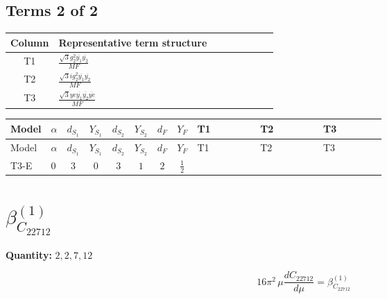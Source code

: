 \documentclass[8pt]{article}
\begin{document}
\begin{landscape}
\subsection*{Terms 2 of 2}
\begin{center}
\begin{tabular}{@{}c >{\raggedright\arraybackslash}p{0.82\linewidth}@{}}
\toprule
Column & Representative term structure \\
\midrule
T1 & \(\displaystyle \frac{\sqrt{3} g_{2}^{2} \overline{y_{1}} \overline{y_{2}}}{MF}\) \\
\midrule
T2 & \(\displaystyle \frac{\sqrt{3} i g_{2}^{2} \overline{y_{1}} \overline{y_{2}}}{MF}\) \\
\midrule
T3 & \(\displaystyle \frac{\sqrt{3} ye \overline{y_{1}} \overline{y_{2}} \overline{ye}}{MF}\) \\
\midrule
\bottomrule
\end{tabular}
\end{center}
\smallskip
\tiny
\begin{longtable}{@{}llcccccc >{\raggedright\arraybackslash}p{0.21\linewidth} >{\raggedright\arraybackslash}p{0.21\linewidth} >{\raggedright\arraybackslash}p{0.21\linewidth}@{}}
\toprule
Model & $\alpha$ & $d_{S_1}$ & $Y_{S_1}$ & $d_{S_2}$ & $Y_{S_2}$ & $d_F$ & $Y_F$ & T1 & T2 & T3 \\
\midrule
\endfirsthead
\toprule
Model & $\alpha$ & $d_{S_1}$ & $Y_{S_1}$ & $d_{S_2}$ & $Y_{S_2}$ & $d_F$ & $Y_F$ & T1 & T2 & T3 \\
\midrule
\endhead
T3-E & $0$ & $3$ & $0$ & $3$ & $1$ & $2$ & $\frac{1}{2}$ & \scriptsize\adjustbox{max width=\linewidth}{$\begin{gathered} \frac{11 \sqrt{3} g_{2}^{2} \overline{y_{1}} \overline{y_{2}}}{8 MF}\end{gathered}$} & \scriptsize\adjustbox{max width=\linewidth}{$\begin{gathered} - \frac{\sqrt{3} i g_{2}^{2} \overline{y_{1}} \overline{y_{2}}}{6 MF}\end{gathered}$} & \scriptsize\adjustbox{max width=\linewidth}{$\begin{gathered} - \frac{\sqrt{3} ye \overline{y_{1}} \overline{y_{2}} \overline{ye}}{12 MF}\end{gathered}$} \\
\midrule
\bottomrule
\end{longtable}
\clearpage
\section*{$\beta_{C_{22712}}^{(1)}$}
\noindent\textbf{Quantity: }$\mathrm{2,2,7,12}$\par\smallskip
\[16\pi^2\,\mu\frac{d C_{22712}}{d\mu}=\beta_{C_{22712}}^{(1)}\]

\end{landscape}
\end{document}
